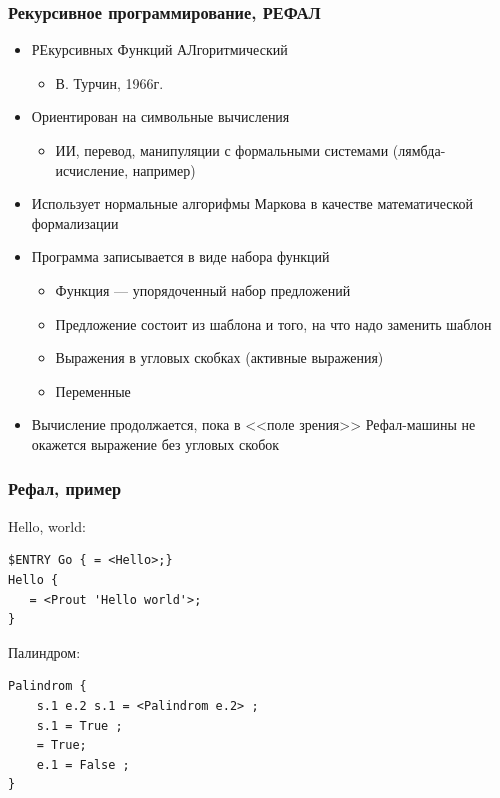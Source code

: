 \documentclass[xetex,mathserif,serif]{beamer}
\begin{document}
    \begin{frame}
        \frametitle{Рекурсивное программирование, РЕФАЛ}
        \begin{itemize}
            \item РЕкурсивных Функций АЛгоритмический
            \begin{itemize}
                \item В. Турчин, 1966г.
            \end{itemize}
            \item Ориентирован на символьные вычисления
            \begin{itemize}
                \item ИИ, перевод, манипуляции с формальными системами (лямбда-исчисление, например)
            \end{itemize}
            \item Использует нормальные алгорифмы Маркова в качестве математической формализации
            \item Программа записывается в виде набора функций
            \begin{itemize}
                \item Функция --- упорядоченный набор предложений
                \item Предложение состоит из шаблона и того, на что надо заменить шаблон
                \item Выражения в угловых скобках (активные выражения)
                \item Переменные
            \end{itemize}
            \item Вычисление продолжается, пока в <<поле зрения>> Рефал-машины не окажется выражение без угловых скобок
        \end{itemize}
    \end{frame}

    \begin{frame}[fragile]
        \frametitle{Рефал, пример}
        Hello, world:
        \begin{verbatim}
$ENTRY Go { = <Hello>;}
Hello {
   = <Prout 'Hello world'>;
}
        \end{verbatim}
        \vspace{3mm}
        Палиндром:
        \begin{verbatim}
Palindrom {
    s.1 e.2 s.1 = <Palindrom e.2> ;
    s.1 = True ;
    = True;
    e.1 = False ;
}
        \end{verbatim}
    \end{frame}
\end{document}
